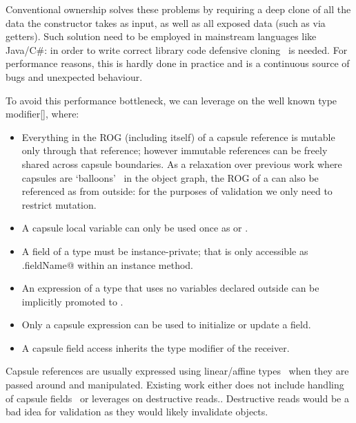 Conventional ownership solves these problems by requiring a deep clone of all the data the constructor takes as input, as well as all exposed data (such as via getters).
Such solution need to be employed in mainstream languages like Java/C\#:
in order to write correct library code
defensive cloning~\cite{Bloch08} is needed.
For performance reasons, this is hardly done in practice and is a continuous source of bugs and unexpected behaviour.

To avoid this performance bottleneck, we can leverage on the well known \Q@capsule@ type modifier[], where:
\begin{itemize}
\item Everything in the ROG (including itself) of a capsule reference is mutable only through that reference; however immutable references can be freely shared across capsule boundaries.
As a relaxation over previous work where capsules are `balloons'~\cite{Almeida97,ServettoEtAl13a} in the object graph, the ROG of a \Q@capsule@ can also be referenced as \Q@read@ from outside:
 for the purposes of validation we only need to restrict mutation.
\item A capsule local variable can only be used once as \Q@capsule@ or \Q@mut@.
\item A field of a \Q@capsule@ type must be instance-private; that is only accessible as \Q@this.fieldName@ within an instance method.
\item An expression of a \Q@mut@ type that uses no \Q@mut@ variables declared outside can be implicitly promoted to \Q@capsule@.
\item Only a capsule expression can be used to initialize or update a \Q@capsule@ field.
\item A capsule field access inherits the type modifier of the receiver.
\end{itemize}

\noindent Capsule references are usually expressed using linear/affine types~\cite{Boyland01} when they are passed around and manipulated. Existing work either does not include handling of capsule fields~\cite{ServettoEtAl13a,ServettoZucca15} or leverages on destructive reads.\cite{GordonEtAl12,clebsch2015deny}.
Destructive reads would be a bad idea for validation as they would likely invalidate objects.

